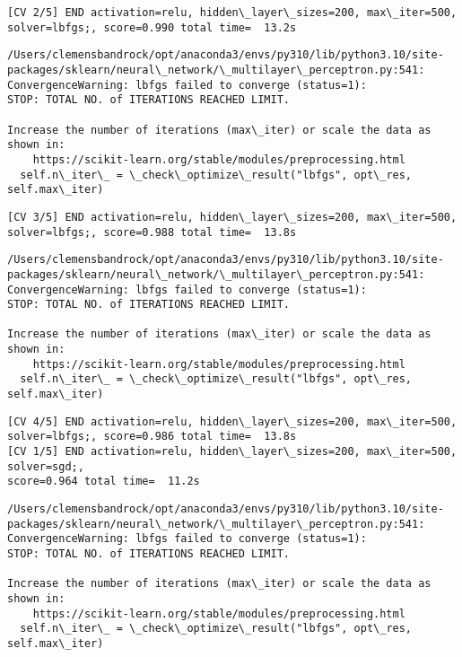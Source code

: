 \documentclass[11pt]{article}
\begin{document}
    \begin{Verbatim}[commandchars=\\\{\}]
[CV 2/5] END activation=relu, hidden\_layer\_sizes=200, max\_iter=500,
solver=lbfgs;, score=0.990 total time=  13.2s
    \end{Verbatim}

    \begin{Verbatim}[commandchars=\\\{\}]
/Users/clemensbandrock/opt/anaconda3/envs/py310/lib/python3.10/site-
packages/sklearn/neural\_network/\_multilayer\_perceptron.py:541:
ConvergenceWarning: lbfgs failed to converge (status=1):
STOP: TOTAL NO. of ITERATIONS REACHED LIMIT.

Increase the number of iterations (max\_iter) or scale the data as shown in:
    https://scikit-learn.org/stable/modules/preprocessing.html
  self.n\_iter\_ = \_check\_optimize\_result("lbfgs", opt\_res, self.max\_iter)
    \end{Verbatim}

    \begin{Verbatim}[commandchars=\\\{\}]
[CV 3/5] END activation=relu, hidden\_layer\_sizes=200, max\_iter=500,
solver=lbfgs;, score=0.988 total time=  13.8s
    \end{Verbatim}

    \begin{Verbatim}[commandchars=\\\{\}]
/Users/clemensbandrock/opt/anaconda3/envs/py310/lib/python3.10/site-
packages/sklearn/neural\_network/\_multilayer\_perceptron.py:541:
ConvergenceWarning: lbfgs failed to converge (status=1):
STOP: TOTAL NO. of ITERATIONS REACHED LIMIT.

Increase the number of iterations (max\_iter) or scale the data as shown in:
    https://scikit-learn.org/stable/modules/preprocessing.html
  self.n\_iter\_ = \_check\_optimize\_result("lbfgs", opt\_res, self.max\_iter)
    \end{Verbatim}

    \begin{Verbatim}[commandchars=\\\{\}]
[CV 4/5] END activation=relu, hidden\_layer\_sizes=200, max\_iter=500,
solver=lbfgs;, score=0.986 total time=  13.8s
[CV 1/5] END activation=relu, hidden\_layer\_sizes=200, max\_iter=500, solver=sgd;,
score=0.964 total time=  11.2s
    \end{Verbatim}

    \begin{Verbatim}[commandchars=\\\{\}]
/Users/clemensbandrock/opt/anaconda3/envs/py310/lib/python3.10/site-
packages/sklearn/neural\_network/\_multilayer\_perceptron.py:541:
ConvergenceWarning: lbfgs failed to converge (status=1):
STOP: TOTAL NO. of ITERATIONS REACHED LIMIT.

Increase the number of iterations (max\_iter) or scale the data as shown in:
    https://scikit-learn.org/stable/modules/preprocessing.html
  self.n\_iter\_ = \_check\_optimize\_result("lbfgs", opt\_res, self.max\_iter)
    \end{Verbatim}
\end{document}
